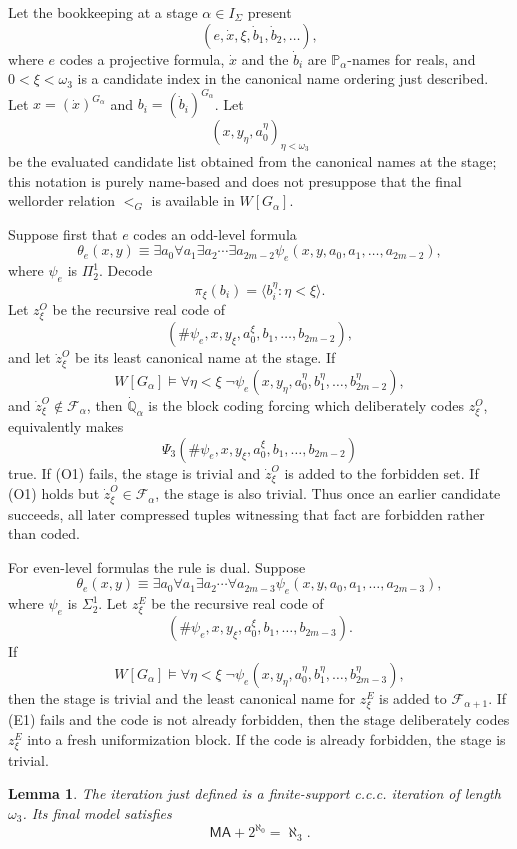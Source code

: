\documentclass[11pt]{article}
\theoremstyle{plain}
\newtheorem{lemma}[theorem]{Lemma}
\theoremstyle{definition}
\theoremstyle{remark}
\newcommand{\Pp}{\mathbb P}
\newcommand{\dotQ}{\dot{\mathbb Q}}
\newcommand{\MA}{\mathsf{MA}}
\newcommand{\PsiThree}{\Psi_{3}}
\newcommand{\Wground}{W}
\begin{document}
Let the bookkeeping at a stage $\alpha\in I_\Sigma$ present
\[
(e,\dot x,\xi,\dot b_1,\dot b_2,\ldots),
\]
where $e$ codes a projective formula, $\dot x$ and the $\dot b_i$ are
$\Pp_\alpha$-names for reals, and $0<\xi<\omega_3$ is a candidate index in the
canonical name ordering just described.  Let $x=(\dot x)^{G_\alpha}$ and
$b_i=(\dot b_i)^{G_\alpha}$.  Let
\[
(x,y_\eta,a^\eta_0)_{\eta<\omega_3}
\]
be the evaluated candidate list obtained from the canonical names at the stage;
this notation is purely name-based and does not presuppose that the final
wellorder relation $<_G$ is available in $\Wground[G_\alpha]$.

Suppose first that $e$ codes an odd-level formula
\[
\theta_e(x,y)\equiv \exists a_0\forall a_1\exists a_2\cdots\exists a_{2m-2}
\psi_e(x,y,a_0,a_1,\ldots,a_{2m-2}),
\]
where $\psi_e$ is $\Pi^1_2$.  Decode
\[
\pi_\xi(b_i)=\langle b_i^\eta:\eta<\xi\rangle.
\]
Let $z^O_\xi$ be the recursive real code of
\[
(\#\psi_e,x,y_\xi,a^\xi_0,b_1,\ldots,b_{2m-2}),
\]
and let $\dot z^O_\xi$ be its least canonical name at the stage.  If
\[
\Wground[G_\alpha]\models
\forall\eta<\xi\;\neg\psi_e(x,y_\eta,a^\eta_0,b_1^\eta,\ldots,b_{2m-2}^\eta),
\tag{O1}
\]
and $\dot z^O_\xi\notin\mathcal F_\alpha$, then $\dotQ_\alpha$ is the block
coding forcing which deliberately codes $z^O_\xi$, equivalently makes
\[
\PsiThree(\#\psi_e,x,y_\xi,a^\xi_0,b_1,\ldots,b_{2m-2})
\]
true.  If (O1) fails, the stage is trivial and $\dot z^O_\xi$ is added to the
forbidden set.  If (O1) holds but $\dot z^O_\xi\in\mathcal F_\alpha$, the stage
is also trivial.  Thus once an earlier candidate succeeds, all later compressed
tuples witnessing that fact are forbidden rather than coded.

For even-level formulas the rule is dual.  Suppose
\[
\theta_e(x,y)\equiv \exists a_0\forall a_1\exists a_2\cdots\forall a_{2m-3}
\psi_e(x,y,a_0,a_1,\ldots,a_{2m-3}),
\]
where $\psi_e$ is $\Sigma^1_2$.  Let $z^E_\xi$ be the recursive real code of
\[
(\#\psi_e,x,y_\xi,a^\xi_0,b_1,\ldots,b_{2m-3}).
\]
If
\[
\Wground[G_\alpha]\models
\forall\eta<\xi\;\neg\psi_e(x,y_\eta,a^\eta_0,b_1^\eta,\ldots,b_{2m-3}^\eta),
\tag{E1}
\]
then the stage is trivial and the least canonical name for $z^E_\xi$ is added to
$\mathcal F_{\alpha+1}$.  If (E1) fails and the code is not already forbidden,
then the stage deliberately codes $z^E_\xi$ into a fresh uniformization block.
If the code is already forbidden, the stage is trivial.

\begin{lemma}\label{lem:iteration-ccc}
The iteration just defined is a finite-support c.c.c. iteration of length
$\omega_3$.  Its final model satisfies
\[
\MA+2^{\aleph_0}=\aleph_3.
\]
\end{lemma}
\end{document}
